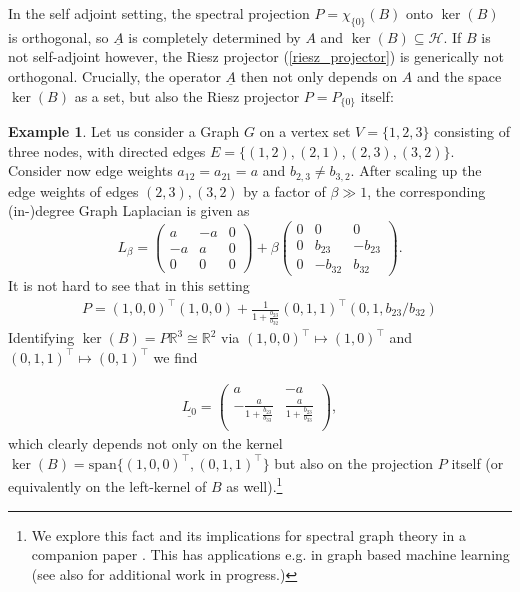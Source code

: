 \documentclass[reqno,12pt,letterpaper]{amsart}
\numberwithin{equation}{section}
\newcommand{\1}{\mathds{1}}
\theoremstyle{definition}
\newtheorem{Ex}[Th]{Example}
\begin{document}
In the self adjoint setting, the spectral projection $P = \chi_{\{0\}}(B)$ onto $\ker(B)$ is orthogonal, so $\underline{A}$ is completely determined by $A$ and $\ker(B) \subseteq \mathcal{H}$.
If $B$ is not self-adjoint however, the Riesz projector (\ref{riesz_projector}) is generically not orthogonal.
Crucially, the operator $\underline{A}$ then not only depends on $A$ and the space $\ker(B)$ as a set, but also the Riesz projector $P = P_{\{0\}}$ itself:
\begin{Ex}\label{graph_theory_I}
	Let us consider a Graph $G$ on a vertex set $V = \{1,2,3\}$ consisting of three nodes, with directed edges $E = \{(1,2),(2,1), (2,3), (3,2)\}$. Consider now edge weights $a_{12}=a_{21} = a$ and $b_{2,3} \neq b_{3,2}$.	
	After scaling up the edge weights of edges $(2,3),(3,2)$ by a factor of $\beta \gg 1$, the corresponding (in-)degree Graph Laplacian is given as 
	\begin{equation}
		L_\beta = \begin{pmatrix}
			a & -a &0\\
			-a & a & 0 \\
			0 & 0 & 0
		\end{pmatrix} 
		+
		\beta
		\begin{pmatrix}
			0 & 0 & 0\\
			0 & b_{23} & - b_{23} \\
			0 & -b_{32} & b_{32}
		\end{pmatrix}.
	\end{equation}
	It is not hard to see that in this setting
	\begin{align}
		P = (1,0,0)^{\intercal} (1,0,0)  + \frac{1}{1 + \frac{b_{23}}{b_{32}}} (0,1,1)^\intercal(0,1,b_{23}/b_{32})	
	\end{align}
	Identifying $\ker(B) = P \mathds{R}^3  \cong \mathds{R}^2$ via  $(1,0,0)^{\intercal}\mapsto (1,0)^{\intercal}$ and $(0,1,1)^{\intercal} \mapsto (0,1)^{\intercal}$ we find
	
	\begin{align}
		\underline{L_0} = 
		\begin{pmatrix}
			a & -a \\
			- \frac{a}{1+ \frac{b_{23}}{b_{33}}}  &  \frac{a}{1+ \frac{b_{23}}{b_{33}}}  \\
		\end{pmatrix},
	\end{align}
	which clearly depends not only on the kernel $\ker(B) = \text{span}\{(1,0,0)^{\intercal}, (0,1,1)^{\intercal}\}$ but also on the projection $P$ itself (or equivalently on the left-kernel of $B$ as well).\footnote{We explore this fact and its implications for spectral graph theory in a companion paper \cite{koke_graph26}. This has applications e.g. in graph based machine learning \cite{GraphScatteringBeyond, limitless, koke2024holonets} (see also \cite{koke2023resolvnet, koke2024transferability, koke2025multiscale, koke2025graphscale, koke2025incorporating} for additional work in progress.)}
\end{Ex}	
	
\end{document}
